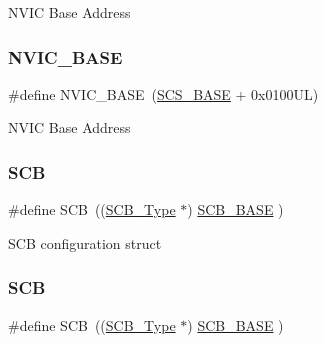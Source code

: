 N\+V\+IC Base Address \mbox{\label{group___c_m_s_i_s__core__base_gaa0288691785a5f868238e0468b39523d}} 
\subsubsection{\texorpdfstring{N\+V\+I\+C\+\_\+\+B\+A\+SE}{NVIC\_BASE}\hspace{0.1cm}{\footnotesize\ttfamily [7/7]}}
{\footnotesize\ttfamily \#define N\+V\+I\+C\+\_\+\+B\+A\+SE~(\mbox{\hyperlink{group___c_m_s_i_s__core__base_ga3c14ed93192c8d9143322bbf77ebf770}{S\+C\+S\+\_\+\+B\+A\+SE}} +  0x0100\+U\+L)}

N\+V\+IC Base Address \mbox{\label{group___c_m_s_i_s__core__base_gaaaf6477c2bde2f00f99e3c2fd1060b01}} 
\subsubsection{\texorpdfstring{S\+CB}{SCB}\hspace{0.1cm}{\footnotesize\ttfamily [1/7]}}
{\footnotesize\ttfamily \#define S\+CB~((\mbox{\hyperlink{struct_s_c_b___type}{S\+C\+B\+\_\+\+Type}}       $\ast$)     \mbox{\hyperlink{group___c_m_s_i_s__core__base_gad55a7ddb8d4b2398b0c1cfec76c0d9fd}{S\+C\+B\+\_\+\+B\+A\+SE}}      )}

S\+CB configuration struct \mbox{\label{group___c_m_s_i_s__core__base_gaaaf6477c2bde2f00f99e3c2fd1060b01}} 
\subsubsection{\texorpdfstring{S\+CB}{SCB}\hspace{0.1cm}{\footnotesize\ttfamily [2/7]}}
{\footnotesize\ttfamily \#define S\+CB~((\mbox{\hyperlink{struct_s_c_b___type}{S\+C\+B\+\_\+\+Type}}       $\ast$)     \mbox{\hyperlink{group___c_m_s_i_s__core__base_gad55a7ddb8d4b2398b0c1cfec76c0d9fd}{S\+C\+B\+\_\+\+B\+A\+SE}}      )}


